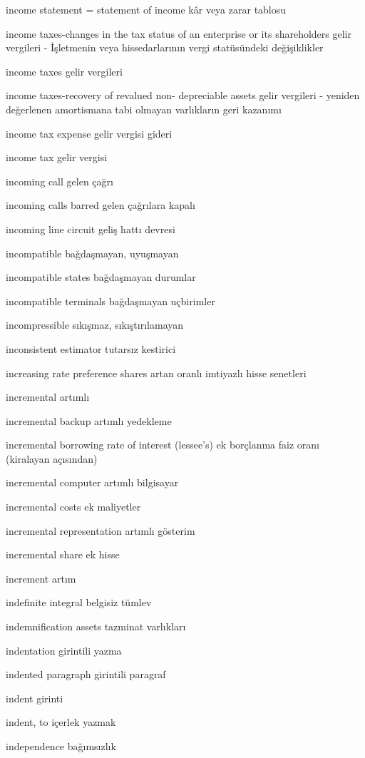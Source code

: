 \documentclass[12pt,fleqn]{article}\usepackage{../../common}
\begin{document}
income statement = statement of income kâr veya zarar tablosu

income taxes-changes in the tax status of an enterprise or its shareholders gelir vergileri - İşletmenin veya hissedarlarının vergi statüsündeki değişiklikler

income taxes gelir vergileri

income taxes-recovery of revalued non- depreciable assets gelir vergileri - yeniden değerlenen amortismana tabi olmayan varlıkların geri kazanımı

income tax expense gelir vergisi gideri

income tax gelir vergisi

incoming call gelen çağrı

incoming calls barred gelen çağrılara kapalı

incoming line circuit geliş hattı devresi

incompatible bağdaşmayan, uyuşmayan

incompatible states bağdaşmayan durumlar

incompatible terminals bağdaşmayan uçbirimler

incompressible sıkışmaz, sıkıştırılamayan

inconsistent estimator tutarsız kestirici

increasing rate preference shares artan oranlı imtiyazlı hisse senetleri

incremental artımlı

incremental backup artımlı yedekleme

incremental borrowing rate of interest (lessee's) ek borçlanma faiz oranı (kiralayan açısından)

incremental computer artımlı bilgisayar

incremental costs ek maliyetler

incremental representation artımlı gösterim

incremental share ek hisse

increment artım

indefinite integral belgisiz tümlev

indemnification assets tazminat varlıkları

indentation girintili yazma

indented paragraph girintili paragraf

indent girinti

indent, to içerlek yazmak

independence bağımsızlık
\end{document}
